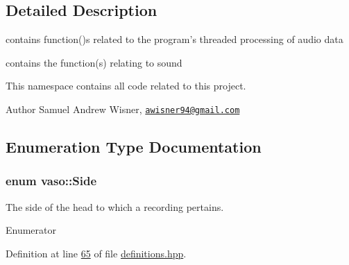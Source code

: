 \subsection{Detailed Description}
contains function()s related to the program's threaded processing of audio data 

contains the function(s) relating to sound

This namespace contains all code related to this project.

\begin{DoxyAuthor}{Author}
Samuel Andrew Wisner, \href{mailto:awisner94@gmail.com}{\tt awisner94@gmail.\+com} 
\end{DoxyAuthor}


\subsection{Enumeration Type Documentation}
\hypertarget{namespacevaso_a77c5d9704657d49d456f691ddd8abf7c}{
\subsubsection[{Side}]{\setlength{\rightskip}{0pt plus 5cm}enum {\bf vaso\+::\+Side}\hspace{0.3cm}{\ttfamily [strong]}}}\label{namespacevaso_a77c5d9704657d49d456f691ddd8abf7c}
The side of the head to which a recording pertains. \begin{Desc}
\item[Enumerator]\par
\begin{description}
\item[{\em 
\hypertarget{namespacevaso_a77c5d9704657d49d456f691ddd8abf7ca945d5e233cf7d6240f6b783b36a374ff}{Left}\label{namespacevaso_a77c5d9704657d49d456f691ddd8abf7ca945d5e233cf7d6240f6b783b36a374ff}
}]\item[{\em 
\hypertarget{namespacevaso_a77c5d9704657d49d456f691ddd8abf7ca92b09c7c48c520c3c55e497875da437c}{Right}\label{namespacevaso_a77c5d9704657d49d456f691ddd8abf7ca92b09c7c48c520c3c55e497875da437c}
}]\end{description}
\end{Desc}


Definition at line \hyperlink{definitions_8hpp_source_l00065}{65} of file \hyperlink{definitions_8hpp_source}{definitions.\+hpp}.



